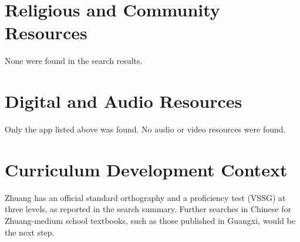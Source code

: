 \documentclass[12pt]{article}
\begin{document}
\section{Religious and Community Resources}
None were found in the search results.

\section{Digital and Audio Resources}
Only the app listed above was found. No audio or video resources were found.

\section{Curriculum Development Context}
Zhuang has an official standard orthography and a proficiency test (VSSG) at three levels, as reported in the search summary. Further searches in Chinese for Zhuang-medium school textbooks, such as those published in Guangxi, would be the next step.
\end{document}
